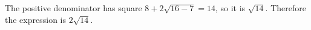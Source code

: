 The positive denominator has square $8+2\sqrt{16-7}=14$, so it is $\sqrt{14}$. Therefore the expression is $\boxed{2\sqrt{14}}$.
